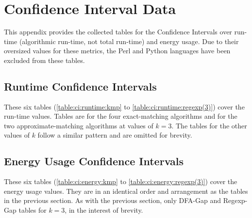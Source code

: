\section{Confidence Interval Data}
\label{sec:conf_interval_data}

This appendix provides the collected tables for the Confidence Intervals over run-time (algorithmic run-time, not total run-time) and energy usage. Due to their oversized values for these metrics, the Perl and Python languages have been excluded from these tables.

\subsection{Runtime Confidence Intervals}

These six tables (\ref{table:ci:runtime:kmp} to \ref{table:ci:runtime:regexp(3)}) cover the run-time values. Tables are for the four exact-matching algorithms and for the two approximate-matching algorithms at values of $k=3$. The tables for the other values of $k$ follow a similar pattern and are omitted for brevity.













\subsection{Energy Usage Confidence Intervals}

These six tables (\ref{table:ci:energy:kmp} to \ref{table:ci:energy:regexp(3)}) cover the energy usage values. They are in an identical order and arrangement as the tables in the previous section. As with the previous section, only DFA-Gap and Regexp-Gap tables for $k=3$, in the interest of brevity.












